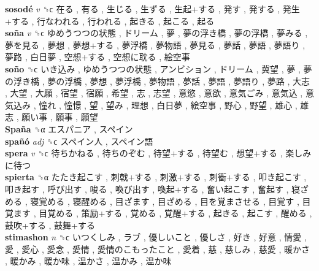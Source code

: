 \textbf{sosodé} \emph{v}  ␝ϲ   在る ,  有る ,  生じる ,  生ずる ,  生起+する ,  発す ,  発する ,  発生+する ,  行なわれる ,  行われる ,  起きる ,  起こる ,  起る   \\
\textbf{soña} \emph{v}  ␝ϲ   ゆめうつつの状態 ,  ドリーム ,  夢 ,  夢の浮き橋 ,  夢の浮橋 ,  夢みる ,  夢を見る ,  夢想 ,  夢想+する ,  夢浮橋 ,  夢物語 ,  夢見る ,  夢話 ,  夢語 ,  夢語り ,  夢路 ,  白日夢 ,  空想+する ,  空想に耽る ,  絵空事   \\
\textbf{soño} ␝ϲ   いき込み ,  ゆめうつつの状態 ,  アンビション ,  ドリーム ,  冀望 ,  夢 ,  夢の浮き橋 ,  夢の浮橋 ,  夢想 ,  夢浮橋 ,  夢物語 ,  夢話 ,  夢語 ,  夢語り ,  夢路 ,  大志 ,  大望 ,  大願 ,  宿望 ,  宿願 ,  希望 ,  志 ,  志望 ,  意慾 ,  意欲 ,  意気ごみ ,  意気込 ,  意気込み ,  憧れ ,  憧憬 ,  望 ,  望み ,  理想 ,  白日夢 ,  絵空事 ,  野心 ,  野望 ,  雄心 ,  雄志 ,  願い事 ,  願事 ,  願望   \\
\textbf{Spaña} ␝α   エスパニア ,  スペイン   \\
\textbf{spañó} \emph{adj}  ␝ϲ   スペイン人 ,  スペイン語   \\
\textbf{spera} \emph{v}  ␝ϲ   待ちかねる ,  待ちのぞむ ,  待望+する ,  待望む ,  想望+する ,  楽しみに待つ   \\
\textbf{spierta} ␝α   たたき起こす ,  刺戟+する ,  刺激+する ,  刺衝+する ,  叩き起こす ,  叩き起す ,  呼び出す ,  唆る ,  喚び出す ,  喚起+する ,  奮い起こす ,  奮起す ,  寝ざめる ,  寝覚める ,  寝醒める ,  目ざます ,  目ざめる ,  目を覚まさせる ,  目覚す ,  目覚ます ,  目覚める ,  策励+する ,  覚める ,  覚醒+する ,  起きる ,  起こす ,  醒める ,  鼓吹+する ,  鼓舞+する   \\
\textbf{stimashon} \emph{n}  ␝ϲ   いつくしみ ,  ラブ ,  優しいこと ,  優しさ ,  好き ,  好意 ,  情愛 ,  愛 ,  愛心 ,  愛念 ,  愛情 ,  愛情のこもったこと ,  愛着 ,  慈 ,  慈しみ ,  慈愛 ,  暖かさ ,  暖かみ ,  暖か味 ,  温かさ ,  温かみ ,  温か味   \\
